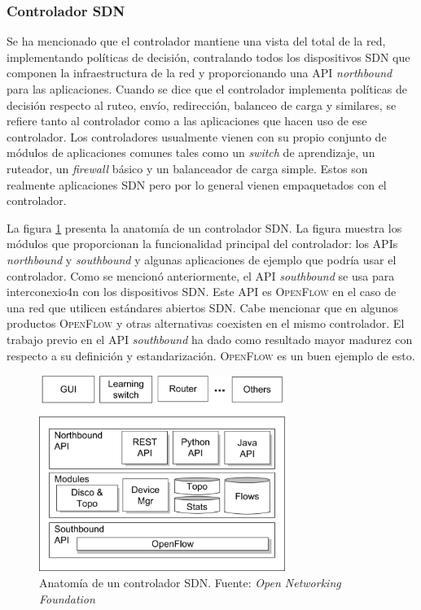 \documentclass[10pt,journal,compsoc]{IEEEtran}
\begin{document}
\subsubsection{Controlador SDN}
Se ha mencionado que el controlador mantiene una vista del total de la red, implementando políticas de decisión, contralando todos los dispositivos SDN que componen la infraestructura de la red y proporcionando una API \emph{northbound} para las aplicaciones. Cuando se dice que el controlador implementa políticas de decisión respecto al ruteo, envío, redirección, balanceo de carga y similares, se refiere tanto al controlador como a las aplicaciones que hacen uso de ese controlador. Los controladores usualmente vienen con su propio conjunto de módulos de aplicaciones comunes tales como un \emph{switch} de aprendizaje, un ruteador, un \emph{firewall} básico y un balanceador de carga simple. Estos son realmente aplicaciones SDN pero por lo general vienen empaquetados con el controlador.

La figura \ref{fig:sdn-controlador-1} presenta la anatomía de un controlador SDN. La figura muestra los módulos que proporcionan la funcionalidad principal del controlador: los APIs \emph{northbound} y \emph{southbound} y algunas aplicaciones de ejemplo que podría usar el controlador. Como se mencionó anteriormente, el API \emph{southbound} se usa para interconexio4n con los dispositivos SDN. Este API es \textsc{OpenFlow} en el caso de una red que utilicen estándares abiertos SDN. Cabe mencionar que en algunos productos \textsc{OpenFlow} y otras alternativas coexisten en el mismo controlador. El trabajo previo en el API \emph{southbound} ha dado como resultado mayor madurez con respecto a su definición y estandarización. \textsc{OpenFlow} es un buen ejemplo de esto.

\begin{figure}[h]
    \centering
    \includegraphics[width=8cm]{controller-1}
    \caption{Anatomía de un controlador SDN. Fuente: \emph{Open Networking Foundation}}
    \label{fig:sdn-controlador-1}
\end{figure}
\end{document}
